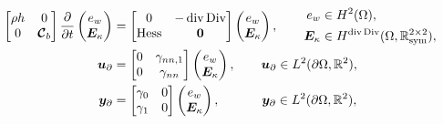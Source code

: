 \begin{subequations}\label{eq:pHlinsys_Kir1}
\begin{align}
\begin{bmatrix}
\rho h & 0 \\
0 & \bm{\mathcal{C}}_b
\end{bmatrix}
\diffp{}{t}
\begin{pmatrix}
e_w \\
\bm{E}_{\kappa} \\
\end{pmatrix} &= 
\begin{bmatrix}
	0  &  - \div\Div \\
	\Hess & \bm{0} \\
	\end{bmatrix}
\begin{pmatrix}
e_w \\
\bm{E}_{\kappa} \\
\end{pmatrix}, \qquad
\begin{aligned}
e_w &\in H^2(\Omega),  \\
\bm{E}_\kappa &\in H^{\div\Div}(\Omega,\mathbb{R}^{2\times 2}_{\text{sym}}), \label{eq:pHdyn_Kir1} \\
\end{aligned} 
 \vspace{3pt}\\
\bm{u}_\partial  &= 
	\begin{bmatrix}
	{0} & \gamma_{nn, 1}\\
	{0} & \gamma_{nn}\\
	\end{bmatrix} \begin{pmatrix}
e_w \\
\bm{E}_{\kappa} \\
\end{pmatrix}, \qquad \bm{u}_\partial \in L^2(\partial\Omega, \mathbb{R}^2), \vspace{3pt}\\
\bm{y}_\partial &= 
	\begin{bmatrix}
	\gamma_{0} & {0} \\
	\gamma_{1} & {0} \\
	\end{bmatrix}
\begin{pmatrix}
e_w \\
\bm{E}_{\kappa} \\
\end{pmatrix}, \qquad\quad\; \bm{y}_\partial \in L^2(\partial\Omega, \mathbb{R}^2),
\end{align}
\end{subequations}
